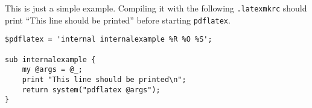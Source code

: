 \documentclass[11pt,a4paper]{article}
\begin{document}
This is just a simple example. Compiling it with the following \texttt{.latexmkrc} should print ``This line should be printed'' before starting \texttt{pdflatex}.

\begin{verbatim}
$pdflatex = 'internal internalexample %R %O %S';

sub internalexample {
    my @args = @_;
    print "This line should be printed\n";
    return system("pdflatex @args");
}
\end{verbatim}
\end{document}
